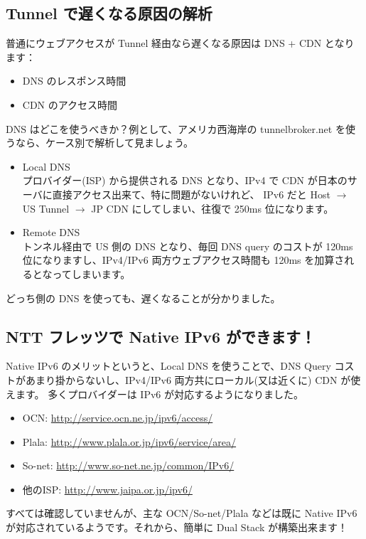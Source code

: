 \documentclass[mingoth,a4paper]{jsarticle}
\begin{document}
\subsection{Tunnel で遅くなる原因の解析}
普通にウェブアクセスが Tunnel 経由なら遅くなる原因は DNS + CDN となります：
\begin{itemize}
\item DNS のレスポンス時間
\item CDN のアクセス時間
\end{itemize}
DNS はどこを使うべきか？例として、アメリカ西海岸の tunnelbroker.net を使うなら、ケース別で解析して見ましょう。
\begin{itemize}
\item Local DNS
\\プロバイダー(ISP) から提供される DNS となり、IPv4 で CDN が日本のサーバに直接アクセス出来て、特に問題がないけれど、
IPv6 だと Host $\rightarrow$ US Tunnel $\rightarrow$ JP CDN にしてしまい、往復で 250ms 位になります。
\item Remote DNS
\\トンネル経由で US 側の DNS となり、毎回 DNS query のコストが 120ms 位になりますし、IPv4/IPv6 両方ウェブアクセス時間も 120ms を加算されるとなってしまいます。
\end{itemize}
どっち側の DNS を使っても、遅くなることが分かりました。
\subsection{NTT フレッツで Native IPv6 ができます！}
Native IPv6 のメリットというと、Local DNS を使うことで、DNS Query コストがあまり掛からないし、IPv4/IPv6 両方共にローカル(又は近くに) CDN が使えます。
多くプロバイダーは IPv6 が対応するようになりました。
\begin{itemize}
\item OCN: \url{http://service.ocn.ne.jp/ipv6/access/}
\item Plala: \url{http://www.plala.or.jp/ipv6/service/area/}
\item So-net: \url{http://www.so-net.ne.jp/common/IPv6/}
\item 他のISP: \url{http://www.jaipa.or.jp/ipv6/}
\end{itemize}
すべては確認していませんが、主な OCN/So-net/Plala などは既に Native IPv6 が対応されているようです。それから、簡単に Dual Stack が構築出来ます！
\end{document}
